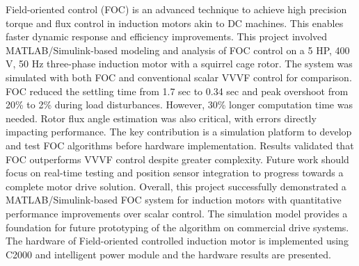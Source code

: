 
\setcounter{page}{1}


\hspace{0.2in}Field-oriented control (FOC) is an advanced technique to achieve high precision torque and flux control in induction motors akin to DC machines. This enables faster dynamic response and efficiency improvements. This project involved MATLAB/Simulink-based modeling and analysis of FOC control on a 5 HP, 400 V, 50 Hz three-phase induction motor with a squirrel cage rotor. The system was simulated with both FOC and conventional scalar VVVF control for comparison. FOC reduced the settling time from 1.7 sec to 0.34 sec and peak overshoot from 20\% to 2\% during load disturbances. However, 30\% longer computation time was needed. Rotor flux angle estimation was also critical, with errors directly impacting performance. The key contribution is a simulation platform to develop and test FOC algorithms before hardware implementation. Results validated that FOC outperforms VVVF control despite greater complexity. Future work should focus on real-time testing and position sensor integration to progress towards a complete motor drive solution. Overall, this project successfully demonstrated a MATLAB/Simulink-based FOC system for induction motors with quantitative performance improvements over scalar control. The simulation model provides a foundation for future prototyping of the algorithm on commercial drive systems. The hardware of Field-oriented controlled induction motor is implemented using C2000 and intelligent power module and the hardware results are presented.


\newpage